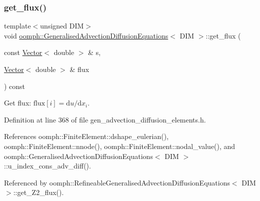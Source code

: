 \subsubsection{\texorpdfstring{get\+\_\+flux()}{get\_flux()}}
{\footnotesize\ttfamily template$<$unsigned D\+IM$>$ \\
void \hyperlink{classoomph_1_1GeneralisedAdvectionDiffusionEquations}{oomph\+::\+Generalised\+Advection\+Diffusion\+Equations}$<$ D\+IM $>$\+::get\+\_\+flux (\begin{DoxyParamCaption}\item[{const \hyperlink{classoomph_1_1Vector}{Vector}$<$ double $>$ \&}]{s,  }\item[{\hyperlink{classoomph_1_1Vector}{Vector}$<$ double $>$ \&}]{flux }\end{DoxyParamCaption}) const\hspace{0.3cm}{\ttfamily [inline]}}



Get flux\+: $\mbox{flux}[i] = \mbox{d}u / \mbox{d}x_i $. 



Definition at line 368 of file gen\+\_\+advection\+\_\+diffusion\+\_\+elements.\+h.



References oomph\+::\+Finite\+Element\+::dshape\+\_\+eulerian(), oomph\+::\+Finite\+Element\+::nnode(), oomph\+::\+Finite\+Element\+::nodal\+\_\+value(), and oomph\+::\+Generalised\+Advection\+Diffusion\+Equations$<$ D\+I\+M $>$\+::u\+\_\+index\+\_\+cons\+\_\+adv\+\_\+diff().



Referenced by oomph\+::\+Refineable\+Generalised\+Advection\+Diffusion\+Equations$<$ D\+I\+M $>$\+::get\+\_\+\+Z2\+\_\+flux().

\mbox{\label{classoomph_1_1GeneralisedAdvectionDiffusionEquations_a33989015fe6f130fc51cc845b6367c39}} 

